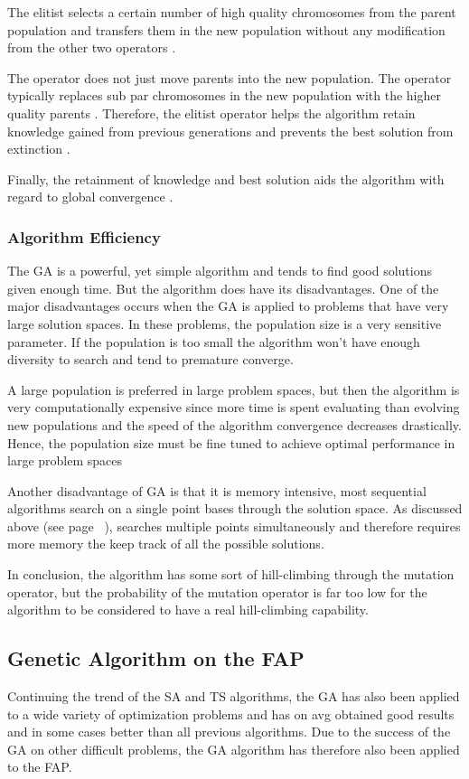 The elitist selects a certain number of high quality chromosomes from the parent population and transfers them in the new population without any modification from the other two operators \cite{PatternDetectionGA}. 

The operator does not just move parents into the new population. The operator typically replaces sub par chromosomes in the new population with the higher quality parents \cite{RealParameterGASA}. Therefore, the elitist operator helps the algorithm retain knowledge gained from previous generations and prevents the best solution from extinction \cite{DynamicPenaltyGA}. 

Finally, the retainment of knowledge and best solution aids the algorithm with regard to global convergence \cite{SelfAdaptiveDataMiningGA}.

\subsubsection{Algorithm Efficiency}
The GA is a powerful, yet simple algorithm and tends to find good solutions given enough time. But the algorithm does have its disadvantages. One of the major disadvantages occurs when the GA is applied to problems that have very large solution spaces. In these problems, the population size is a very sensitive parameter. If the population is too small the algorithm won't have enough diversity to search and tend to premature converge. 

A large population is preferred in large problem spaces, but then the algorithm is very computationally expensive since more time is spent evaluating than evolving new populations and the speed of the algorithm convergence decreases drastically. Hence, the population size must be fine tuned to achieve optimal performance in large problem spaces

Another disadvantage of GA is that it is memory intensive, most sequential algorithms search on a single point bases through the solution space. As discussed above (see page ~\pageref{GASearchPoints}), searches multiple points simultaneously and therefore requires more memory the keep track of all the possible solutions.

In conclusion, the algorithm has some sort of hill-climbing through the mutation operator, but the probability of the mutation operator is far too low for the algorithm to be considered to have a real hill-climbing capability.

\subsection{Genetic Algorithm on the FAP}
Continuing the trend of the SA and TS algorithms, the GA has also been applied to a wide variety of optimization problems and has on avg obtained good results and in some cases better than all previous algorithms. Due to the success of the GA on other difficult problems, the GA algorithm has therefore also been applied to the FAP.

